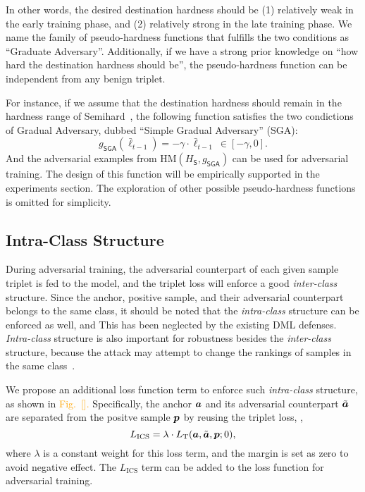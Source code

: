 \documentclass[10pt,twocolumn,letterpaper]{article}
\newcommand{\oo}[1]{\textcolor{orange}{#1}}
\begin{document}

In other words, the desired destination hardness should be (1) relatively weak
in the early training phase, and (2) relatively strong in the late training
phase.
%
We name the family of pseudo-hardness functions that fulfills the two
conditions as ``Graduate Adversary''.
%
Additionally, if we have a strong prior knowledge on ``how hard the destination
hardness should be'', the pseudo-hardness function can be independent from
any benign triplet.


For instance, if we assume that the destination hardness should remain
in the hardness range of Semihard~\cite{facenet}, the following function
satisfies the two condictions of Gradual Adversary, dubbed
``Simple Gradual Adversary'' (SGA):
%
\begin{equation}
	g_\mathsf{SGA}(\bar{\ell}_{t-1}) =
	-\gamma \cdot \bar{\ell}_{t-1} ~ \in [-\gamma,0].
\end{equation}
%
And the adversarial examples from $\text{HM}(H_\mathsf{S},g_\mathsf{SGA})$
can be used for adversarial training.
%
The design of this function will be empirically supported in the experiments
section.
%
The exploration of other possible pseudo-hardness functions is omitted 
for simplicity.

\subsection{Intra-Class Structure}
\label{sec:33}


During adversarial training, the adversarial counterpart of each given sample
triplet is fed to the model, and the triplet loss will enforce a good
\emph{inter-class} structure.
%
Since the anchor, positive sample, and their adversarial counterpart belongs to
the same class, it should be noted that the \emph{intra-class} structure can be
enforced as well, and This has been neglected by the existing DML defenses.
%
\emph{Intra-class} structure is also important for robustness besides the
\emph{inter-class} structure, because the attack may attempt to change the
rankings of samples in the same class~\cite{advrank}.


We propose an additional loss function term to enforce such \emph{intra-class}
structure, as shown in \oo{Fig.~[].}
%
Specifically, the anchor ${\bm{a}}$ and its adversarial counterpart $\tilde{{\bm{a}}}$
are separated from the positve sample ${\bm{p}}$ by reusing the triplet loss,
\ie,
%
\begin{equation}
	L_\text{ICS} = \lambda \cdot L_\text{T}(
	{\bm{a}}, \tilde{{\bm{a}}}, {\bm{p}}; 0),
\end{equation}
%
where $\lambda$ is a constant weight for this loss term,
and the margin is set as zero to avoid negative effect.
%
The $L_\text{ICS}$ term can be added to the loss function for
adversarial training.
\end{document}
